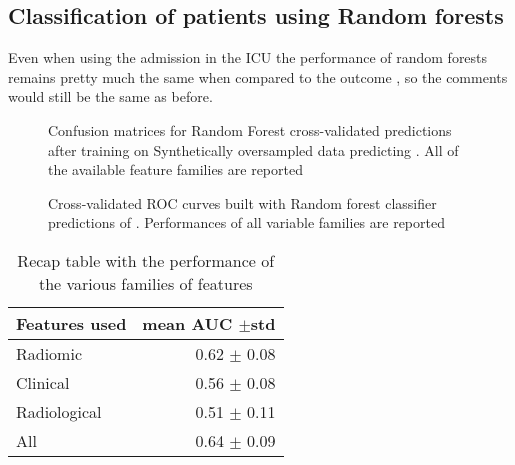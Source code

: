 \subsection{Classification of patients using Random forests}
Even when using the admission in the ICU the performance of random forests remains pretty much the same when compared to the outcome \death, so the comments would still be the same as before.

\begin{figure}[H]
\centering
	\newline
        \caption{Confusion matrices for Random Forest cross-validated predictions after training on Synthetically oversampled data predicting \icu. All of the available feature families are reported}\label{fig:RFicu}
\end{figure}


\begin{figure}[H]
\centering
	\newline
        \caption{Cross-validated ROC curves built with Random forest classifier predictions of \death. Performances of all variable families are reported}\label{fig:RFicuROC}
\end{figure}


\begin{table}
\caption{Recap table with the performance of the various families of features \label{tab:RecapicuRF}}
\centering
\begin{tabular}{l|r}
\toprule
Features used & mean AUC $\pm$std\\
\midrule
Radiomic  & 0.62 $\pm$ 0.08\\
Clinical  &  0.56 $\pm$ 0.08\\
Radiological & 0.51 $\pm$ 0.11\\
All & 0.64 $\pm$ 0.09\\
\bottomrule
\end{tabular}
\end{table}

